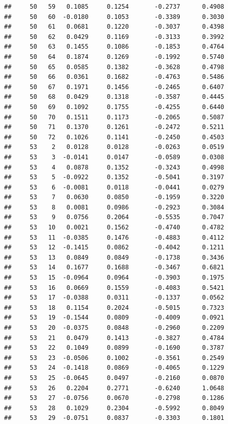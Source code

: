 \documentclass[
]{article}
\begin{document}
\begin{verbatim}
##     50   59   0.1085     0.1254       -0.2737      0.4908  
##     50   60  -0.0180     0.1053       -0.3389      0.3030  
##     50   61   0.0681     0.1220       -0.3037      0.4398  
##     50   62   0.0429     0.1169       -0.3133      0.3992  
##     50   63   0.1455     0.1086       -0.1853      0.4764  
##     50   64   0.1874     0.1269       -0.1992      0.5740  
##     50   65   0.0585     0.1382       -0.3628      0.4798  
##     50   66   0.0361     0.1682       -0.4763      0.5486  
##     50   67   0.1971     0.1456       -0.2465      0.6407  
##     50   68   0.0429     0.1318       -0.3587      0.4445  
##     50   69   0.1092     0.1755       -0.4255      0.6440  
##     50   70   0.1511     0.1173       -0.2065      0.5087  
##     50   71   0.1370     0.1261       -0.2472      0.5211  
##     50   72   0.1026     0.1141       -0.2450      0.4503  
##     53    2   0.0128     0.0128       -0.0263      0.0519  
##     53    3  -0.0141     0.0147       -0.0589      0.0308  
##     53    4   0.0878     0.1352       -0.3243      0.4998  
##     53    5  -0.0922     0.1352       -0.5041      0.3197  
##     53    6  -0.0081     0.0118       -0.0441      0.0279  
##     53    7   0.0630     0.0850       -0.1959      0.3220  
##     53    8   0.0081     0.0986       -0.2923      0.3084  
##     53    9   0.0756     0.2064       -0.5535      0.7047  
##     53   10   0.0021     0.1562       -0.4740      0.4782  
##     53   11  -0.0385     0.1476       -0.4883      0.4112  
##     53   12  -0.1415     0.0862       -0.4042      0.1211  
##     53   13   0.0849     0.0849       -0.1738      0.3436  
##     53   14   0.1677     0.1688       -0.3467      0.6821  
##     53   15  -0.0964     0.0964       -0.3903      0.1975  
##     53   16   0.0669     0.1559       -0.4083      0.5421  
##     53   17  -0.0388     0.0311       -0.1337      0.0562  
##     53   18   0.1154     0.2024       -0.5015      0.7323  
##     53   19  -0.1544     0.0809       -0.4009      0.0921  
##     53   20  -0.0375     0.0848       -0.2960      0.2209  
##     53   21   0.0479     0.1413       -0.3827      0.4784  
##     53   22   0.1049     0.0899       -0.1690      0.3787  
##     53   23  -0.0506     0.1002       -0.3561      0.2549  
##     53   24  -0.1418     0.0869       -0.4065      0.1229  
##     53   25  -0.0645     0.0497       -0.2160      0.0870  
##     53   26   0.2204     0.2771       -0.6240      1.0648  
##     53   27  -0.0756     0.0670       -0.2798      0.1286  
##     53   28   0.1029     0.2304       -0.5992      0.8049  
##     53   29  -0.0751     0.0837       -0.3303      0.1801  

\end{verbatim}
\end{document}
